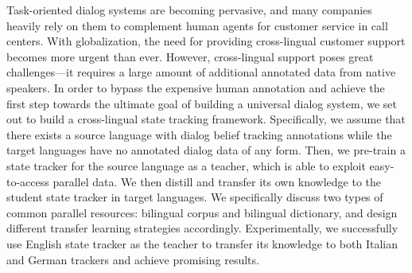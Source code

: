 Task-oriented dialog systems are becoming pervasive, and many companies heavily rely on them to complement human agents for customer service in call centers. With globalization, the need for providing cross-lingual customer support becomes more urgent than ever. However, cross-lingual support poses great challenges---it requires a large amount of additional annotated data from native speakers. In order to bypass the expensive human annotation and achieve the first step towards the ultimate goal of building a universal dialog system, we set out to build a cross-lingual state tracking framework. Specifically, we assume that there exists a source language with dialog belief tracking annotations while the target languages have no annotated dialog data of any form. Then, we pre-train a state tracker for the source language as a teacher, which is able to exploit easy-to-access parallel data. We then distill and transfer its own knowledge to the student state tracker in target languages. We specifically discuss two types of common parallel resources: bilingual corpus and bilingual dictionary, and design different transfer learning strategies accordingly. Experimentally, we successfully use English state tracker as the teacher to transfer its knowledge to both Italian and German trackers and achieve promising results.
